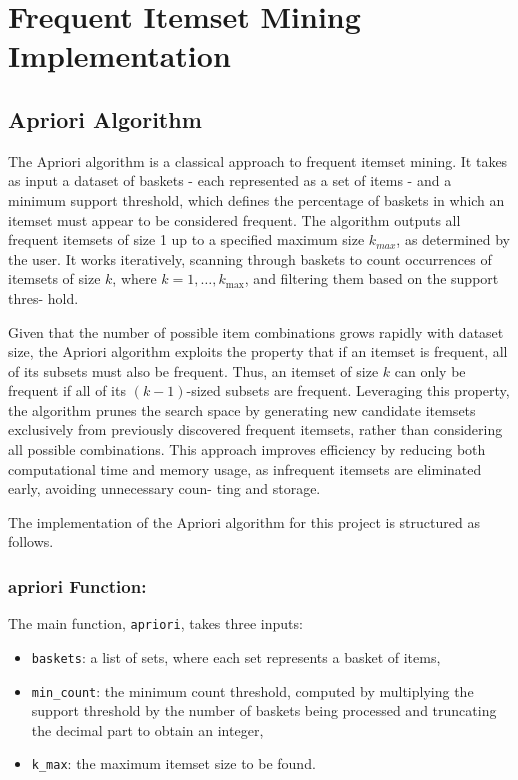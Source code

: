 \documentclass{Class/julia}
\begin{document}
\section{Frequent Itemset Mining Implementation}\label{sec:2}

\subsection{Apriori Algorithm}

The Apriori algorithm is a classical approach to frequent itemset mining. It takes as input a dataset of baskets - each represented as a set of items - and a minimum support threshold, which defines the percentage of baskets in which an itemset must appear to be considered frequent. The algorithm outputs all frequent itemsets of size 1 up to a specified maximum size \( k_{max} \), as determined by the user. It works iteratively, scanning through baskets to count occurrences of itemsets of size \( k \), where \( k = 1, \dots, k_{\max} \), and filtering them based on the support thres- hold.

Given that the number of possible item combinations grows rapidly with dataset size, the Apriori algorithm exploits the property that if an itemset is frequent, all of its subsets must also be frequent. Thus, an itemset of size \( k \) can only be frequent if all of its \( (k-1) \)-sized subsets are frequent. Leveraging this property, the algorithm prunes the search space by generating new candidate itemsets exclusively from previously discovered frequent itemsets, rather than considering all possible combinations. This approach improves efficiency by reducing both computational time and memory usage, as infrequent itemsets are eliminated early, avoiding unnecessary coun- ting and storage.

The implementation of the Apriori algorithm for this project is structured as follows.

\subsubsection*{apriori Function:}

The main function, \texttt{apriori}, takes three inputs:

\begin{itemize}
\item \texttt{baskets}: a list of sets, where each set represents a basket of items,
\item \texttt{min\_count}: the minimum count threshold, computed by multiplying the support threshold by the number of baskets being processed and truncating the decimal part to obtain an integer,
\item \texttt{k\_max}: the maximum itemset size to be found.
\end{itemize}
\end{document}
